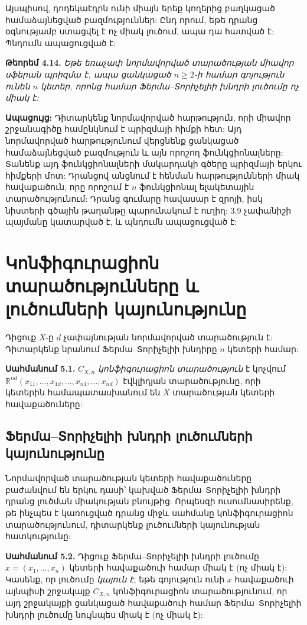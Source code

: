 \documentclass[12pt,a4paper]{article}
\numberwithin{equation}{section}
\numberwithin{figure}{section}
\begin{document}
Այսպիսով, դոդեկաէդրն ունի միայն երեք կողերից բաղկացած համաձայնեցված բազմություններ: Ընդ որում, եթե դրանց օգնությամբ ստացվել է ոչ միակ լուծում, ապա դա հատված է: Պնդումն ապացուցված է: 

\textbf{Թեորեմ 4.14.} \textit{Եթե եռաչափ նորմավորված տարածության միավոր սֆերան պրիզմա է, ապա ցանկացած $n \ge 2$-ի համար գոյություն ունեն $n$ կետեր, որոնց համար Ֆերմա--Տորիչելիի խնդրի լուծումը ոչ միակ է:}

\textbf{Ապացույց:} Դիտարկենք նորմավորված հարթություն, որի միավոր շրջանագիծը համընկնում է պրիզմայի հիմքի հետ: Այդ նորմավորված հարթությունում վերցնենք ցանկացած համաձայնեցված բազմություն և այն որոշող ֆունկցիոնալները: Տանենք այդ ֆունկցիոնալների մակարդակի գծերը պրիզմայի երկու հիմքերի մոտ: Դրանցով անցնում է հենման հարթությունների միակ հավաքածուն, որը որոշում է $n$ ֆունկցիոնալ ելակետային տարածությունում: Դրանց գումարը հավասար է զրոյի, իսկ նիստերի գծային թաղանթը պարունակում է ուղիղ: 3.9 չափանիշի պայմանը կատարված է, և պնդումն ապացուցված է: 

\section{Կոնֆիգուրացիոն տարածությունները և լուծումների կայունությունը}

Դիցուք $X$-ը $d$ չափայնության նորմավորված տարածություն է: Դիտարկենք նրանում Ֆերմա--Տորիչելիի խնդիրը $n$ կետերի համար:

\textbf{Սահմանում 5.1.} $C_{X,n}$ \textit{կոնֆիգուրացիոն տարածություն} է կոչվում $\mathbb{R}^{nd}(x_{11}, \dots, x_{1d}, \dots, x_{n1}, \dots, x_{nd})$ էվկլիդյան տարածությունը, որի կետերին համապատասխանում են $X$ տարածության կետերի հավաքածուները:

\subsection{Ֆերմա--Տորիչելիի խնդրի լուծումների կայունությունը}

Նորմավորված տարածության կետերի հավաքածուները բաժանվում են երկու դասի՝ կախված Ֆերմա--Տորիչելիի խնդրի դրանց լուծման միակության բնույթից: Որպեսզի ուսումնասիրենք, թե ինչպես է կառուցված դրանց միջև սահմանը կոնֆիգուրացիոն տարածությունում, դիտարկենք լուծումների կայունության հատկությունը:

\textbf{Սահմանում 5.2.} Դիցուք Ֆերմա--Տորիչելիի խնդրի լուծումը $x = (x_1, \dots, x_n)$ կետերի հավաքածուի համար միակ է (ոչ միակ է): Կասենք, որ լուծումը \textit{կայուն է}, եթե գոյություն ունի $x$ հավաքածուի այնպիսի շրջակայք $C_{X,n}$ կոնֆիգուրացիոն տարածությունում, որ այդ շրջակայքի ցանկացած հավաքածուի համար Ֆերմա--Տորիչելիի խնդրի լուծումը նույնպես միակ է (ոչ միակ է):
\end{document}
